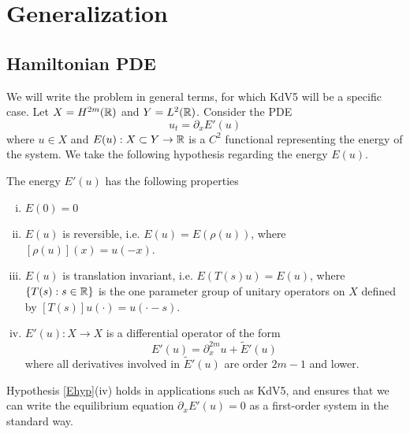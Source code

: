 \documentclass[thesis.tex]{subfiles}
\begin{document}
\chapter{Generalization}

\section{Hamiltonian PDE}

We will write the problem in general terms, for which KdV5 will be a specific case. Let $X = H^{2m}({\mathbb R})$ and $Y = L^2({\mathbb R})$. Consider the PDE
\begin{equation}\label{genPDE}
u_t = \partial_x E'(u)
\end{equation}
where $u \in X$ and $E(u): X \subset Y \rightarrow {\mathbb R}$ is a $C^2$ functional representing the energy of the system. We take the following hypothesis regarding the energy $E(u)$.

\begin{hypothesis}\label{Ehyp}
The energy $E'(u)$ has the following properties
\begin{enumerate}[(i)]
\item $E(0) = 0$
\item $E(u)$ is reversible, i.e. $E(u) = E(\rho(u))$, where $[\rho(u)](x) = u(-x)$.
\item $E(u)$ is translation invariant, i.e. $E(T(s)u) = E(u)$, where $\{T(s) : s \in {\mathbb R} \}$ is the one parameter group of unitary operators on $X$ defined by $[T(s)]u(\cdot) = u(\cdot - s)$.
\item $E'(u): X \rightarrow X$ is a differential operator of the form
\begin{equation}\label{Eprimeuform}
E'(u) = \partial_x^{2m}u + \tilde{E}'(u)
\end{equation}
where all derivatives involved in $\tilde{E}'(u)$ are order $2m-1$ and lower.
\end{enumerate}
\end{hypothesis}

Hypothesis \ref{Ehyp}(iv) holds in applications such as KdV5, and ensures that we can write the equilibrium equation $\partial_x E'(u) = 0$ as a first-order system in the standard way.
\end{document}
